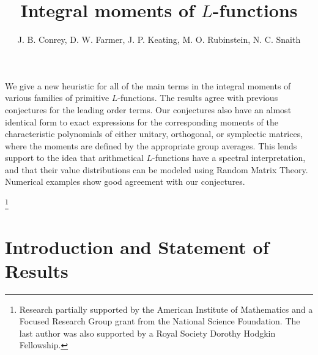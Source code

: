 \documentclass[12pt,letterpaper]{amsart}
\theoremstyle{plain}
\theoremstyle{definition}
\theoremstyle{remark}
\numberwithin{equation}{subsection}
\numberwithin{theorem}{subsection}
\numberwithin{table}{subsection}
\begin{document}
\title{
Integral moments of $L$-functions
 }


\abstract
We give a new heuristic for all of the main terms in the
integral moments of various families of primitive $L$-functions.  The
results agree with previous conjectures for the leading
order terms.  Our conjectures also have an almost identical form to
exact expressions for the corresponding moments of the
characteristic polynomials of either unitary, orthogonal,
or symplectic matrices, where the moments are defined by
the appropriate group averages.  This lends support to the
idea that arithmetical $L$-functions have a spectral
interpretation, and that their value distributions can be
modeled using Random Matrix Theory.  Numerical examples
show good agreement with our conjectures.
\endabstract
\author{
J. B. Conrey, D. W. Farmer, J. P. Keating,
M. O. Rubinstein, N. C. Snaith
 }


\address{
{\parskip 0pt
American Institute of Mathematics Portage Ave.\endgraf
Palo Alto, CA 94306\endgraf
\null
Department of Mathematics\endgraf
Oklahoma State University\endgraf
Stillwater, OK 74078-0613\endgraf
\null
School of Mathematics\endgraf
University of Bristol \endgraf
Clifton, Bristol\endgraf
BS8 1TW\endgraf
United Kingdom\endgraf
\null
Pure Mathematics\endgraf
University of Waterloo \endgraf
Waterloo, Ontario\endgraf
N2L 3G1\endgraf
Canada\endgraf
}
  }




\thanks{
Research partially supported by the American Institute of
Mathematics and a Focused Research Group grant from the National
Science Foundation. The last author was also supported by a Royal
Society Dorothy Hodgkin Fellowship.
 }



\maketitle

 \tableofcontents

\newpage


\parskip 4pt

\section{  Introduction and Statement of Results
}\label{sec:intro}
\end{document}
